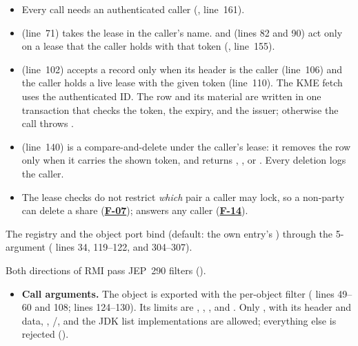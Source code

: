 \documentclass[11pt,a4paper]{article}
\newcommand{\fid}[1]{\textbf{#1}}
\begin{document}
\begin{description}[style=nextline,leftmargin=1.2em]
\begin{itemize}
\item Every call needs an authenticated caller (, line~161).
\item {} (line~71) takes the lease in the caller's name.  and  (lines 82 and 90) act only on a lease that the caller holds with that token (, line~155).
\item {} (line~102) accepts a record only when its header  is the caller (line~106) and the caller holds a live lease with the given token (line~110). The KME fetch uses the authenticated ID. The row  and its material are written in one transaction that checks the token, the expiry, and the issuer; otherwise the call throws .
\item {} (line~140) is a compare-and-delete under the caller's lease: it removes the row only when it carries the shown token, and returns , , or . Every deletion logs the caller.
\item The lease checks do not restrict \emph{which} pair a caller may lock, so a non-party can delete a share (\hyperref[f:F-07]{\fid{F-07}});  answers any caller (\hyperref[f:F-14]{\fid{F-14}}).
\end{itemize}
\item[C-3 Bind address]\label{c:C-3} The registry and the object port bind  (default: the own entry's ) through the 5-argument  ( lines 34, 119--122, and 304--307).
\item[C-4 Deserialization allow-lists for RMI calls and replies]\label{c:C-4} Both directions of RMI pass JEP~290 filters ().
\begin{itemize}
\item \textbf{Call arguments.} The  object is exported with the per-object filter  ( lines 49--60 and 108;  lines 124--130). Its limits are , , , and . Only ,  with its header and data, , /, and the JDK list implementations are allowed; everything else is rejected (\code{!*}).

\end{itemize}
\end{description}
\end{document}
